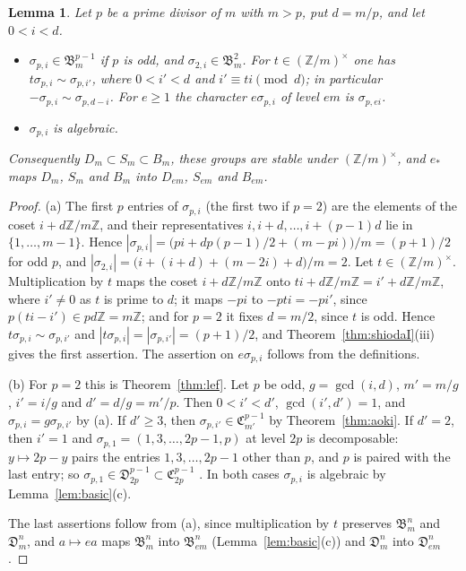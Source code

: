 \documentclass[11pt]{amsart}
\newtheorem{lemma}[theorem]{Lemma}
\theoremstyle{definition}
\theoremstyle{remark}
\numberwithin{equation}{section}
\newcommand{\Z}{\mathbb{Z}}
\newcommand{\fB}{\mathfrak{B}}
\newcommand{\fC}{\mathfrak{C}}
\newcommand{\fD}{\mathfrak{D}}
\begin{document}
\begin{lemma}\label{lem:standard}
Let $p$ be a prime divisor of $m$ with $m>p$, put $d=m/p$, and let $0<i<d$.
\begin{itemize}
\item[(a)] $\sigma_{p,i}\in\fB^{p-1}_m$ if $p$ is odd, and $\sigma_{2,i}\in\fB^2_m$. For $t\in(\Z/m)^\times$ one has $t\sigma_{p,i}\sim\sigma_{p,i'}$, where $0<i'<d$ and $i'\equiv ti\pmod d$; in particular $-\sigma_{p,i}\sim\sigma_{p,d-i}$. For $e\ge1$ the character $e\sigma_{p,i}$ of level $em$ is $\sigma_{p,ei}$.
\item[(b)] $\sigma_{p,i}$ is algebraic.
\end{itemize}
Consequently $D_m\subset S_m\subset B_m$, these groups are stable under $(\Z/m)^\times$, and $e_*$ maps $D_m$, $S_m$ and $B_m$ into $D_{em}$, $S_{em}$ and $B_{em}$.
\end{lemma}

\begin{proof}
(a) The first $p$ entries of $\sigma_{p,i}$ (the first two if $p=2$) are the elements of the coset $i+d\Z/m\Z$, and their representatives $i,i+d,\dots,i+(p-1)d$ lie in $\{1,\dots,m-1\}$. Hence $|\sigma_{p,i}|=\bigl(pi+dp(p-1)/2+(m-pi)\bigr)/m=(p+1)/2$ for odd $p$, and $|\sigma_{2,i}|=\bigl(i+(i+d)+(m-2i)+d\bigr)/m=2$. Let $t\in(\Z/m)^\times$. Multiplication by $t$ maps the coset $i+d\Z/m\Z$ onto $ti+d\Z/m\Z=i'+d\Z/m\Z$, where $i'\ne0$ as $t$ is prime to $d$; it maps $-pi$ to $-pti=-pi'$, since $p(ti-i')\in pd\Z=m\Z$; and for $p=2$ it fixes $d=m/2$, since $t$ is odd. Hence $t\sigma_{p,i}\sim\sigma_{p,i'}$ and $|t\sigma_{p,i}|=|\sigma_{p,i'}|=(p+1)/2$, and Theorem~\ref{thm:shiodaI}(iii) gives the first assertion. The assertion on $e\sigma_{p,i}$ follows from the definitions.

(b) For $p=2$ this is Theorem~\ref{thm:lef}. Let $p$ be odd, $g=\gcd(i,d)$, $m'=m/g$, $i'=i/g$ and $d'=d/g=m'/p$. Then $0<i'<d'$, $\gcd(i',d')=1$, and $\sigma_{p,i}=g\sigma_{p,i'}$ by (a). If $d'\ge3$, then $\sigma_{p,i'}\in\fC^{p-1}_{m'}$ by Theorem~\ref{thm:aoki}. If $d'=2$, then $i'=1$ and $\sigma_{p,1}=(1,3,\dots,2p-1,p)$ at level $2p$ is decomposable: $y\mapsto 2p-y$ pairs the entries $1,3,\dots,2p-1$ other than $p$, and $p$ is paired with the last entry; so $\sigma_{p,1}\in\fD^{p-1}_{2p}\subset\fC^{p-1}_{2p}$ \cite[Thm.~1-1]{Ao87}. In both cases $\sigma_{p,i}$ is algebraic by Lemma~\ref{lem:basic}(c).

The last assertions follow from (a), since multiplication by $t$ preserves $\fB^n_m$ and $\fD^n_m$, and $a\mapsto ea$ maps $\fB^n_m$ into $\fB^n_{em}$ (Lemma~\ref{lem:basic}(c)) and $\fD^n_m$ into $\fD^n_{em}$.
\end{proof}
\end{document}
